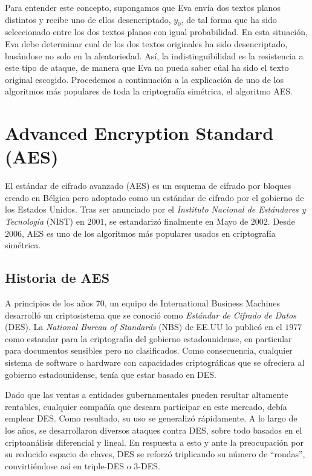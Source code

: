     Para entender este concepto, supongamos que Eva envía dos textos planos distintos y recibe uno de ellos desencriptado, $y_{0}$, de tal forma que ha sido seleccionado entre los dos textos planos con igual probabilidad. En esta situación, Eva debe determinar cual de los dos textos originales ha sido desencriptado, basándose no solo en la aleatoriedad. Así, la indistinguibilidad es la resistencia a este tipo de ataque, de manera que Eva no pueda saber cúal ha sido el texto original escogido. Procedemos a continuación a la explicación de uno de los algoritmos más populares de toda la criptografía simétrica, el algoritmo AES.

    \section{Advanced Encryption Standard (AES)}

    El estándar de cifrado avanzado (AES) es un esquema de cifrado por bloques creado en Bélgica pero adoptado como un estándar de cifrado por el gobierno de los Estados Unidos. Tras ser anunciado por el \textit{Instituto Nacional de Estándares y Tecnología} (NIST) en $2001$, se estandarizó finalmente en Mayo de $2002$. Desde $2006$, AES es uno de los algoritmos más populares usados en criptografía simétrica.

    \subsection{Historia de AES}

    A principios de los años $70$, un equipo de International Business Machines desarrolló un criptosistema que se conoció como \textit{Estándar de Cifrado de Datos} (DES). La \textit{National Bureau of Standards} (NBS) de EE.UU lo publicó en el $1977$ como estandar para la criptografía del gobierno estadounidense, en particular para documentos sensibles pero no clasificados. Como consecuencia, cualquier sistema de software o hardware con capacidades criptográficas que se ofreciera al gobierno estadounidense, tenía que estar basado en DES. 
    
    Dado que las ventas a entidades gubernamentales pueden resultar altamente rentables, cualquier compañía que deseara participar en este mercado, debía emplear DES. Como resultado, su uso se generalizó rápidamente. A lo largo de los años, se desarrollaron diversos ataques contra DES, sobre todo basados en el criptoanálisis diferencial y lineal. En respuesta a esto y ante la preocupación por su reducido espacio de claves, DES se reforzó triplicando su número de ``rondas'', convirtiéndose así en triple-DES o $3$-DES.

